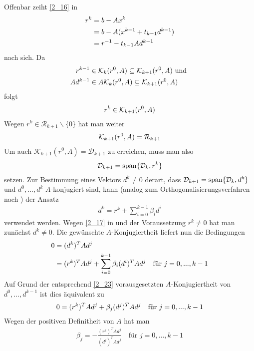 Offenbar zeiht \cref{2_16} in 
\begin{align}
	r^k &= b-Ax^k \notag \\
	&= b-A(x^{k-1}+t_{k-1}d^{k-1}) \notag \\
	&= r^{-1} - t_{k-1}Ad^{k-1} \notag
\end{align}
nach sich. Da
\begin{align}
	r^{k-1}&\in\mathcal{K}_k(r^0,A)\subseteq\mathcal{K}_{k+1}(r^0,A)\text{ und } \notag \\
	Ad^{k-1}&\in A\mathcal{K}_k(r^0,A)\subseteq\mathcal{K}_{k+1}(r^0,A) \notag
\end{align}
folgt
\begin{align}
	r^k\in\mathcal{K}_{k+1}(r^0,A)\notag
\end{align}
Wegen $r^k\in\mathcal{R}_{k+1}\backslash\{0\}$ hat man weiter
\begin{align}
	\mathcal{K}_{k+1}(r^0,A) = \mathcal{R}_{k+1}\notag
\end{align}
Um auch $\mathcal{K}_{k+1}(r^0,A)=\mathcal{D}_{k+1}$ zu erreichen, muss man also
\begin{align}
	\mathcal{D}_{k+1} = \operatorname{span}\{\mathcal{D}_k,r^k\}\notag
\end{align}
setzen. Zur Bestimmung eines Vektors $d^k\neq 0$ derart, dass $\mathcal{D}_{k+1} = \operatorname{span}\{\mathcal{D}_k,d^k\}$ und $d^0,...,d^k$ $A$-konjugiert sind, kann (analog zum Orthogonalisierungsverfahren nach ) der Ansatz
\begin{align}
	\label{2_25}
	d^k=r^k+\sum_{i=0}^{k-1}\beta_id^i
\end{align}
verwendet werden. Wegen \cref{2_17} in  und der Voraussetzung $r^k\neq 0$ hat man zunächst $d^k\neq 0$. Die gewünschte $A$-Konjugiertheit liefert nun die Bedingungen
\begin{align}
	0&=(d^k)^TAd^j \notag \\
	&= (r^k)^TAd^j+\sum_{i=0}^{k-1}\beta_i(d^i)^TAd^j\quad\text{für } j=0,...,k-1\notag
\end{align}
Auf Grund der entsprechend \cref{2_23} vorausgesetzten $A$-Konjugiertheit von $d^0,...,d^{k-1}$ ist dies äquivalent zu
\begin{align}
	0=(r^k)^TAd^j+\beta_j(d^j)^TAd^j\quad\text{für } j=0,...,k-1\notag
\end{align}
Wegen der positiven Definitheit von $A$ hat man
\begin{align}
	\label{2_26}
	\beta_j = -\frac{(r^k)^TAd^j}{(d^j)^TAd^j}\quad\text{für } j=0,...,k-1
\end{align}
